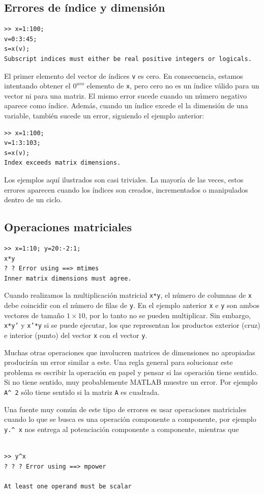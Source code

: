 \documentclass[11pt]{article}
\begin{document}
\subsection{Errores de \'indice y dimensi\'on}
\begin{verbatim}
>> x=1:100;
v=0:3:45;
s=x(v);
Subscript indices must either be real positive integers or logicals.
\end{verbatim}
El primer elemento del vector de \'indices \texttt{v} es cero. En consecuencia, estamos 
intentando obtener el $0^{avo}$ elemento de \texttt{x}, pero cero no es un \'indice v\'alido 
para un vector ni para una matriz. El mismo error sucede cuando un n\'umero negativo aparece 
como \'indice. Adem\'as, cuando un \'indice excede el la dimensi\'on de una variable, 
tambi\'en sucede un error, siguiendo el ejemplo anterior:
\begin{verbatim}
>> x=1:100;
v=1:3:103;
s=x(v);
Index exceeds matrix dimensions.
\end{verbatim}
Los ejemplos aqu\'i ilustrados son casi triviales. La mayor\'ia de las veces, 
estos errores aparecen cuando los \'indices son creados, incrementados 
o manipulados dentro de un ciclo.

\subsection{Operaciones matriciales}
\begin{verbatim}
>> x=1:10; y=20:-2:1; 
x*y
? ? Error using ==> mtimes
Inner matrix dimensions must agree.
\end{verbatim}
Cuando realizamos la multiplicaci\'on matricial \texttt{x*y}, el n\'umero de columnas 
de \texttt{x} debe coincidir con el n\'umero de filas de \texttt{y}. En el ejemplo anterior 
\texttt{x} e \texttt{y} son ambos vectores de tamaño $1\times 10$, por lo tanto 
no se pueden multiplicar. Sin embargo, \texttt{x*y'} y \texttt{x'*y} si se puede ejecutar, 
los que representan los productos exterior (cruz) e interior (punto) del vector \texttt{x} con el 
vector \texttt{y}.

Muchas otras operaciones que involucren matrices de dimensiones no apropiadas producir\'an un error
similar a este. Una regla general para solucionar este problema es escribir la operaci\'on en papel 
y pensar si las operaci\'on tiene sentido. Si no tiene sentido, muy probablemente MATLAB muestre un error.
Por ejemplo \texttt{A\^{} 2} s\'olo tiene sentido si la matriz \texttt{A} es cuadrada.

Una fuente muy com\'un de este tipo de errores es usar operaciones matriciales 
cuando lo que se busca es una operaci\'on componente a componente, por ejemplo
\texttt{y.\^{} x} nos entrega al potenciaci\'on componente a componente, mientras que 
\begin{verbatim}
  
>> y^x
? ? ? Error using ==> mpower

At least one operand must be scalar
\end{verbatim}
\end{document}
